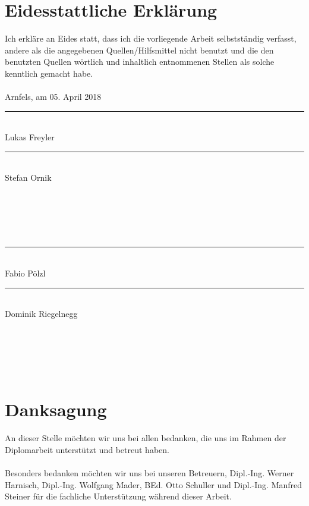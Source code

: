 \frontmatter												%
\addtocounter{page}{2}

\newcommand{\doublesignature}[2]{%
  \parbox{\textwidth}{
    \hfill
    \parbox{7cm}{
      \centering
      \rule{6cm}{1pt}\\
      #1
    }
    \parbox{7cm}{
      \centering
      \rule{6cm}{1pt}\\
      #2
    }
  }
  \mbox{}\\
  \mbox{}\\
  \mbox{}\\
  \mbox{}\\
}

\vspace*{20pt}

\section*{Eidesstattliche Erklärung}
\label{sec:eidestattliche-erklaerung}
Ich erkläre an Eides statt, dass ich die vorliegende Arbeit selbstständig verfasst, andere als die angegebenen
Quellen/Hilfsmittel nicht benutzt und die den benutzten Quellen wörtlich und inhaltlich entnommenen
Stellen als solche kenntlich gemacht habe.\\
\\
Arnfels, am 05. April 2018\\

\vskip 2cm

\doublesignature{Lukas Freyler}{Stefan Ornik}
\doublesignature{Fabio Pölzl}{Dominik Riegelnegg}

\vskip 5cm

\clearpage

\newpage
\thispagestyle{empty}
\mbox{}

\clearpage

\section*{Danksagung}
\label{sec:danksagung}
An dieser Stelle möchten wir uns bei allen bedanken, die uns im Rahmen der Diplomarbeit unterstützt und betreut haben.\\
\\
Besonders bedanken möchten wir uns bei unseren Betreuern, Dipl.-Ing. Werner Harnisch, Dipl.-Ing. Wolfgang Mader, BEd. Otto Schuller
und Dipl.-Ing. Manfred Steiner für die fachliche Unterstützung während dieser Arbeit.

\newpage

